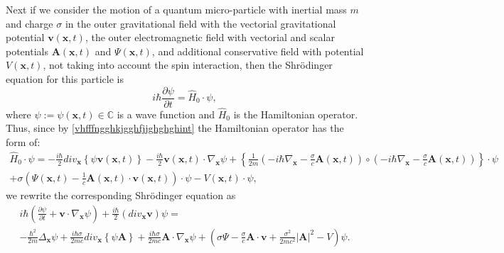 \documentclass{article}
\theoremstyle{definition}
\theoremstyle{remark}
\renewcommand{\vec}[1]{\mathbf{#1}}
\newcommand{\er}{\eqref}
\newcommand{\er}{\eqref}
\begin{document}
Next if we consider the motion of a quantum micro-particle with
inertial mass $m$ and charge $\sigma$ in the outer gravitational
field with the vectorial gravitational potential $\vec v(\vec x,t)$,
the outer electromagnetic field with vectorial and scalar potentials
$\vec A(\vec x,t)$ and $\Psi(\vec x,t)$, and additional conservative
field with potential $V(\vec x,t)$, not taking into account the spin
interaction, then the Shr\"{o}dinger equation for this particle is
\begin{equation}\label{vhfffngghkjgghfjjghghghhjghjgghkghggkghghjghint}
i\hbar\frac{\partial\psi}{\partial t}=\hat H_0\cdot\psi,
\end{equation}
where $\psi:=\psi(\vec x,t)\in\mathbb{C}$ is a wave function and
$\hat H_0$ is the Hamiltonian operator. Thus, since by
\er{vhfffngghkjgghfjjghghghint} the Hamiltonian operator has the
form of:
\begin{multline}\label{vhfffngghkjgghfjjghghghhjghjgghkghgghjhggjjkgint}
\hat H_0\cdot\psi= -\frac{i\hbar}{2}div_{\vec x}\left\{\psi\vec
v(\vec x,t)\right\}-\frac{i\hbar}{2}\vec v(\vec
x,t)\cdot\nabla_{\vec x}\psi+
\left\{\frac{1}{2m}\left(-i\hbar\nabla_{\vec x}-\frac{\sigma}{c}\vec
A(\vec x,t)\right)\circ\left(-i\hbar\nabla_{\vec
x}-\frac{\sigma}{c}\vec A(\vec
x,t)\right)\right\}\cdot\psi\\+\sigma\left(\Psi(\vec
x,t)-\frac{1}{c}\vec A(\vec x,t)\cdot\vec v(\vec
x,t)\right)\cdot\psi-V\left(\vec x,t\right)\cdot\psi,
\end{multline}
we rewrite the corresponding Shr\"{o}dinger equation as
\begin{multline}\label{vhfffngghkjgghfjjghghghhjghjgghkghgghjhggjjkgfgdiyfgfjkjgjgint}
i\hbar\left(\frac{\partial\psi}{\partial t}+\vec v\cdot\nabla_{\vec
x}\psi\right)+\frac{i\hbar}{2}\left(div_{\vec x}\vec v\right)\psi=\\
-\frac{\hbar^2}{2m}\Delta_{\vec x}\psi+\frac{
i\hbar\sigma}{2mc}div_{\vec x}\left\{\psi\vec A\right\}+\frac{
i\hbar\sigma}{2mc}\vec A\cdot\nabla_{\vec
x}\psi+\left(\sigma\Psi-\frac{\sigma}{c}\vec A\cdot\vec
v+\frac{\sigma^2}{2mc^2}\left|\vec A\right|^2-V\right)\psi.
\end{multline}
\end{document}
